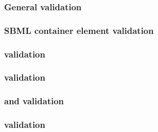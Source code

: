 \begin{sbmlenum}

\end{sbmlenum} \subsubsection*{General  validation} \begin{sbmlenum}


\end{sbmlenum} \subsubsection*{SBML container element validation} \begin{sbmlenum}


\end{sbmlenum} \subsubsection*{ validation} \begin{sbmlenum}


\end{sbmlenum} \subsubsection*{ validation} \begin{sbmlenum}


\end{sbmlenum} \subsubsection*{ and  validation} \begin{sbmlenum}



\end{sbmlenum} \subsubsection*{ validation} \begin{sbmlenum}


\end{sbmlenum}
